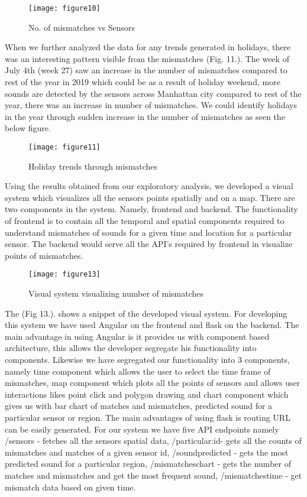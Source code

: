 	\begin{figure}[h!]
		\centering
		\texttt{[image: figure10]}
		\caption{No. of mismatches vs Sensors}
	\end{figure}

	When we further analyzed the data for any trends generated in holidays, there was an interesting pattern visible from the mismatches (Fig. 11.). The week of July 4th (week 27) saw an increase in the number of mismatches compared to rest of the year in 2019 which could be as a result of holiday weekend, more sounds are detected by the sensors across Manhattan city compared to rest of the year, there was an increase in number of mismatches. We could identify holidays in the year through sudden increase in the number of mismatches as seen the below figure.

	\begin{figure}[h!]
		\centering
		\texttt{[image: figure11]}
		\caption{Holiday trends through mismatches}
	\end{figure}
	
	Using the results obtained from our exploratory analysis, we developed a visual system which visualizes all the sensors points spatially and on a map. There are two components in the system. Namely, frontend and backend. The functionality of frontend is to contain all the temporal and spatial components required to understand mismatches of sounds for a given time and location for a particular sensor.  The backend would serve all the API's required by frontend in visualize points of mismatches.
	
	\begin{figure}[h!]
	\centering
	\texttt{[image: figure13]}
	\caption{Visual system visualizing number of mismatches}
	\end{figure}
	
	The (Fig 13.). shows a snippet of the developed visual system. For developing this system we have used Angular on the frontend and flask on the backend. The main advantage in using Angular is it provides us with component based architecture, this allows the developer segregate his functionality into components. Likewise we have segregated our functionality into 3 components, namely time component which allows the user to select the time frame of mismatches, map component which plots all the points of sensors and allows user interactions likes point click and polygon drawing and chart component which gives us with bar chart of matches and mismatches, predicted sound for a particular sensor or region. The main advantages of using flask is routing URL can be easily generated. For our system we have five API endpoints namely /sensors - fetches all the sensors spatial data, /particular:id- gets all the counts of mismatches and matches of a given sensor id, /soundpredicted - gets the most predicted sound for a particular region, /mismatcheschart - gets the number of matches and mismatches and get the most frequent sound, /mismatchestime - get mismatch data based on given time.